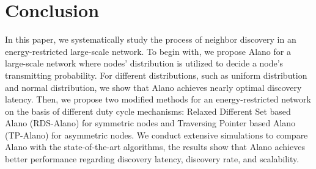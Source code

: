 \section{Conclusion}
\label{Conclusion}
In this paper, we systematically study the process of neighbor discovery in an energy-restricted large-scale network. To begin with, we propose Alano for a large-scale network where nodes' distribution is utilized to decide a node's transmitting probability. For different distributions, such as uniform distribution and normal distribution, we show that Alano achieves nearly optimal discovery latency. Then, we propose two modified methods for an energy-restricted network on the basis of different duty cycle mechanisms: Relaxed Different Set based Alano (RDS-Alano) for symmetric nodes and Traversing Pointer based Alano (TP-Alano) for asymmetric nodes. We conduct extensive simulations to compare Alano with the state-of-the-art algorithms, the results show that Alano achieves better performance regarding discovery latency, discovery rate, and scalability.%
